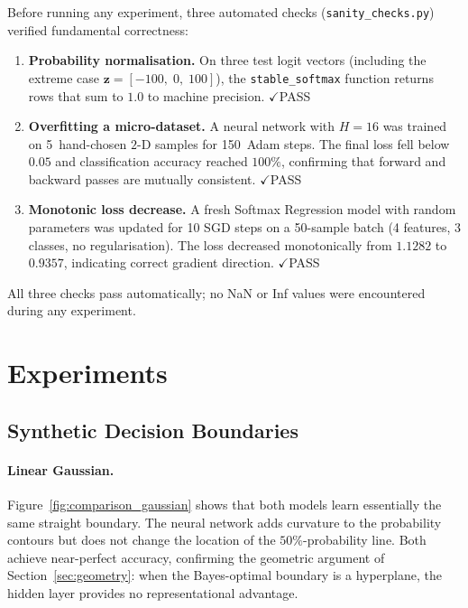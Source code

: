 \documentclass[11pt]{article}
\newcommand{\bz}{\mathbf{z}}
\begin{document}
Before running any experiment, three automated checks (\texttt{sanity\_checks.py}) verified
fundamental correctness:

\begin{enumerate}[label=\textbf{Check~\arabic*.},leftmargin=3em,itemsep=0.3em]
  \item \textbf{Probability normalisation.}
        On three test logit vectors (including the extreme case
        $\bz=[-100,\;0,\;100]$), the \texttt{stable\_softmax} function returns rows that sum to
        $1.0$ to machine precision.
        \hfill$\checkmark$\;PASS

  \item \textbf{Overfitting a micro-dataset.}
        A neural network with $H{=}16$ was trained on 5~hand-chosen $2$-D samples for 150~Adam
        steps.  The final loss fell below $0.05$ and classification accuracy reached $100\%$,
        confirming that forward and backward passes are mutually consistent.
        \hfill$\checkmark$\;PASS

  \item \textbf{Monotonic loss decrease.}
        A fresh Softmax Regression model with random parameters was updated for 10 SGD steps on a
        50-sample batch (4 features, 3 classes, no regularisation).  The loss decreased
        monotonically from $1.1282$ to $0.9357$, indicating correct gradient direction.
        \hfill$\checkmark$\;PASS
\end{enumerate}

All three checks pass automatically; no NaN or Inf values were encountered during any experiment.

\section{Experiments}

\subsection{Synthetic Decision Boundaries}

\paragraph{Linear Gaussian.}
Figure~\ref{fig:comparison_gaussian} shows that both models learn essentially the same straight
boundary.  The neural network adds curvature to the probability contours but does not change the
location of the $50\%$-probability line.  Both achieve near-perfect accuracy, confirming the
geometric argument of Section~\ref{sec:geometry}: when the Bayes-optimal boundary is a
hyperplane, the hidden layer provides no representational advantage.
\end{document}
